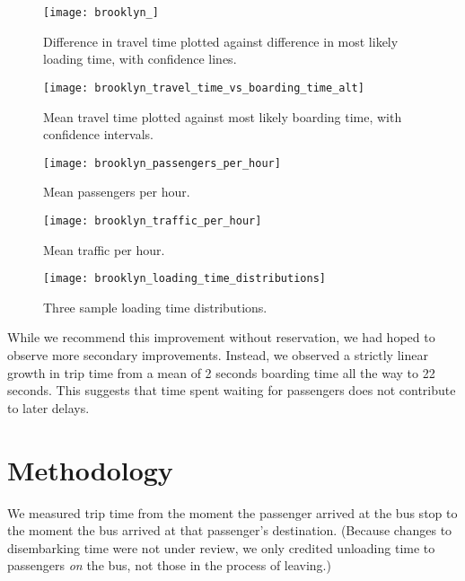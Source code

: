 \documentclass[12pt]{article}
\theoremstyle{definition}
\begin{document}
\begin{figure}
    \centering
    \hfill%
    \begin{minipage}[t]{.45\linewidth}
            \texttt{[image: brooklyn\_]}
            \caption{Difference in travel time plotted against difference in most
            likely loading time, with confidence lines.}
            \label{fig:change}
    \end{minipage}%
    \hfill%
    \begin{minipage}[t]{.45\linewidth}
        \texttt{[image: brooklyn\_travel\_time\_vs\_boarding\_time\_alt]}
        \caption{Mean travel time plotted against most likely boarding time,
        with confidence intervals.}
        \label{fig:travelvloading}
    \end{minipage}
    \hfill

    \hfill%
    \begin{minipage}[t]{.45\linewidth}
        \texttt{[image: brooklyn\_passengers\_per\_hour]}
        \caption{Mean passengers per hour.}
        \label{fig:passengers}
    \end{minipage}%
    \hfill%
    \begin{minipage}[t]{.45\linewidth}
        \texttt{[image: brooklyn\_traffic\_per\_hour]}
        \caption{Mean traffic per hour.}
        \label{fig:traffic}
    \end{minipage}%
    \hfill

    \begin{minipage}[t]{.45\linewidth}
        \texttt{[image: brooklyn\_loading\_time\_distributions]}
        \caption{Three sample loading time distributions.}
        \label{fig:loading}
    \end{minipage}%
\end{figure}

While we recommend this improvement without reservation, we had hoped to
observe more secondary improvements. Instead, we observed a strictly linear
growth in trip time from a mean of 2 seconds boarding time all the way to 22
seconds. This suggests that time spent waiting for passengers does not
contribute to later delays.

\section{Methodology}

We measured trip time from the moment the passenger arrived at the bus stop to
the moment the bus arrived at that passenger's destination. (Because changes
to disembarking time were not under review, we only credited unloading time to
passengers \emph{on} the bus, not those in the process of leaving.)
\end{document}
